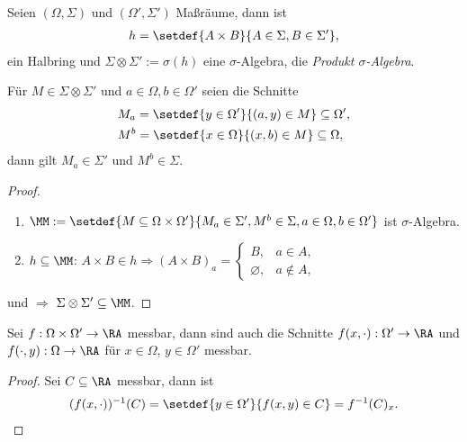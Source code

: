 \begin{prop}
\label{prop:3.47}
Seien $(\Omega,\Sigma)$ und $(\Omega',\Sigma')$ Maßräume, dann ist
\begin{align*}
h = \setdef{A\times B}{A\in\Sigma, B\in\Sigma'},
\end{align*}
ein Halbring und $\Sigma\otimes\Sigma':= \sigma(h)$ eine $\sigma$-Algebra,
die \emph{Produkt $\sigma$-Algebra}.

Für $M\in\Sigma\otimes\Sigma'$ und $a\in\Omega,b\in\Omega'$ seien die
Schnitte
\begin{align*}
&M_a = \setdef{y\in\Omega'}{(a,y)\in M}\subseteq\Omega',\\
&M^b = \setdef{x\in\Omega}{(x,b)\in M}\subseteq\Omega,
\end{align*}
dann gilt $M_a\in\Sigma'$ und $M^b\in\Sigma$.\fishhere
\end{prop}
\begin{proof}
\begin{enumerate}[label=(\roman{*})]
  \item\label{proof:3.47:1} $\MM:= \setdef{M\subseteq
  \Omega\times\Omega'}{M_a\in\Sigma', M^b\in\Sigma, a\in\Omega,b\in\Omega'}$ ist $\sigma$-Algebra.
  \item\label{proof:3.47:2} $h\subseteq \MM$: $A\times B\in h\Rightarrow
  (A\times B)_a =
  \begin{cases}
  B, &a\in A,\\
  \varnothing, & a\notin A,
  \end{cases}$
\end{enumerate}
\label{proof:3.47:1} und \label{proof:3.47:1} $\Rightarrow$
$\Sigma\otimes\Sigma' \subseteq \MM$.\qedhere
\end{proof}

\begin{corn}
Sei $f: \Omega\times\Omega'\to\RA$ messbar, dann sind auch die Schnitte
$f(x,\cdot) : \Omega'\to\RA$ und $f(\cdot,y): \Omega\to\RA$ für $x\in\Omega$,
$y\in\Omega'$ messbar.\fishhere
\end{corn}
\begin{proof}
Sei $C\subseteq\RA$ messbar, dann ist
\begin{align*}
(f(x,\cdot))^{-1}(C)
= \setdef{y\in\Omega'}{f(x,y)\in C} = f^{-1}(C)_x.\qedhere
\end{align*}
\end{proof}


